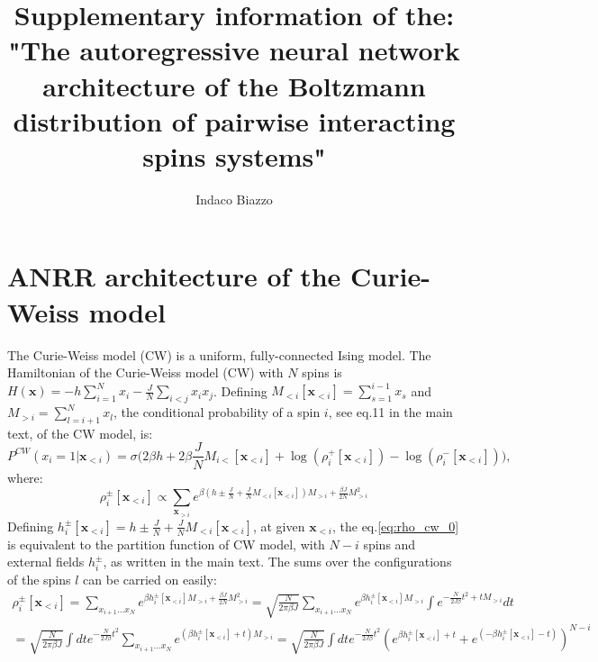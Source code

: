 \documentclass[10pt, notitlepage]{revtex4-2}
\begin{document}
\title{Supplementary information of the: "The autoregressive neural network architecture of the Boltzmann distribution of pairwise interacting spins systems"}

\author{Indaco Biazzo}
\maketitle
\tableofcontents

\section{ANRR architecture of the Curie-Weiss model}

The Curie-Weiss model (CW) is a uniform, fully-connected Ising model. The Hamiltonian of the Curie-Weiss model (CW) with $N$ spins is $H\left(\mathbf{x}\right)=-h\sum_{i=1}^{N}x_{i}-\frac{J}{N}\sum_{i<j}x_{i}x_{j}$. Defining $M_{<i}[\mathbf{x}_{<i}]=\sum_{s=1}^{i-1}x_{s}$ and $M_{>i}=\sum_{l=i+1}^{N}x_{l}$, the conditional probability of a spin $i$, see eq.11 in the main text, of the CW model, is:
\begin{equation}
P^{CW}\left(x_{i}=1|\mathbf{x}_{<i}\right) = 
\sigma\bigg( 
 2 \beta h + 2 \beta \frac{J}{N}M_{i<}[\mathbf{x}_{<i}] + %
 \log(\rho_i^+[\mathbf{x}_{<i}]) - \log(\rho_i^-[\mathbf{x}_{<i}])
\bigg),
\label{eq:conditional_cw}
\end{equation}
where:
\begin{equation}
\rho_i^{\pm}[\mathbf{x}_{<i}] \propto \sum_{\mathbf{x}_{>i}}e^{\beta \left(h\pm\frac{J}{N}+\frac{J}{N}M_{<i}[\mathbf{x}_{<i}]\right)M_{>i}+\frac{\beta J}{2N}M_{>i}^{2}} 
\label{eq:rho_cw_0}
\end{equation}
Defining $h_i^{\pm}[\mathbf{x}_{<i}] =h\pm\frac{J}{N}+\frac{J}{N}M_{<i}[\mathbf{x}_{<i}]$, at given $\mathbf{x}_{<i}$, the eq.\ref{eq:rho_cw_0} is equivalent to the partition function of CW model, with $N-i$ spins and external fields $h_i^{\pm}$, as written in the main text. 
The sums over the configurations of the spins $l$ can be carried on easily: 
\begin{multline}
 \rho_i^{\pm}[\mathbf{x}_{<i}] = \sum_{x_{i+1}\dots x_{N}} e^{\beta h_i^{\pm}[\mathbf{x}_{<i}]M_{>i} +\frac{\beta J}{2N}M_{>i}^{2}} = \sqrt{\frac{N}{2\pi \beta J}}\sum_{x_{i+1}\dots x_{N}}e^{\beta h_i^{\pm}[\mathbf{x}_{<i}] M_{>i}}\int e^{-\frac{N}{2J \beta}t^{2}+t M_{>i}} dt\\
  = \sqrt{\frac{N}{2\pi \beta J}}\int dt e^{-\frac{N}{2J \beta}t^{2}} \sum_{x_{i+1}\dots x_{N}}e^{(\beta h_i^{\pm}[\mathbf{x}_{<i}] + t) M_{>i}}  
 =  \sqrt{\frac{N}{2\pi \beta J}}\int dt e^{-\frac{N}{2J \beta}t^{2}} \left(e^{\beta h_i^{\pm}[\mathbf{x}_{<i}] + t} + e^{ (-\beta h_i^{\pm}[\mathbf{x}_{<i}] - t)} \right)^{N-i}  \\ 
 \label{eq:rho_last_exact}
 \end{multline} 
\end{document}
